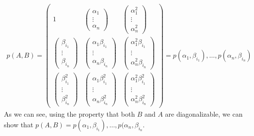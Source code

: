 \begin{gather*}
p(A,B) =  \left( \begin{array}{ccc}
1 & \left( \begin{array}{c} \alpha_1 \\ \vdots \\ \alpha_n \end{array} \right) & \left( \begin{array}{c} \alpha_1^2 \\ \vdots \\ \alpha_n^2 \end{array} \right) \\
\left( \begin{array}{c} \beta_{i_1} \\ \vdots \\ \beta_{i_n} \end{array} \right) & \left( \begin{array}{c} \alpha_1 \beta_{i_1} \\ \vdots \\ \alpha_n \beta_{i_n} \end{array} \right) & \left( \begin{array}{c} \alpha_1^2 \beta_{i_1} \\ \vdots \\ \alpha_n^2 \beta_{i_n} \end{array} \right)  \\
\left( \begin{array}{c} \beta_{i_1}^2 \\ \vdots \\ \beta_{i_n}^2 \end{array} \right)&
\left( \begin{array}{c} \alpha_1 \beta_{i_1}^2 \\ \vdots \\ \alpha_n \beta_{i_n}^2 \end{array} \right) & \left( \begin{array}{c} \alpha_1^2 \beta_{i_1}^2 \\ \vdots \\ \alpha_n^2 \beta_{i_n}^2 \end{array} \right)
\end{array} \right) =
p(\alpha_1,\beta_{i_1}) , \ldots , p(\alpha_n,\beta_{i_n} )
\end{gather*}
As we can see, using the property that both $B$ and $A$ are diagonalizable, we can show that $p(A,B) = p(\alpha_1,\beta_{i_1}) , \ldots , p(\alpha_n,\beta_{i_n} $. 
